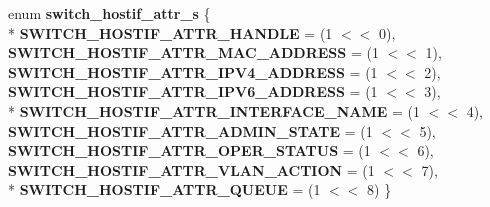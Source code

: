 \begin{DoxyCompactItemize}
\item 
\hypertarget{group__HostInterface_ga2afb2a6d4f95e81cc08ee0d6b3198780}{enum {\bfseries switch\+\_\+hostif\+\_\+attr\+\_\+s} \{ \\*
{\bfseries S\+W\+I\+T\+C\+H\+\_\+\+H\+O\+S\+T\+I\+F\+\_\+\+A\+T\+T\+R\+\_\+\+H\+A\+N\+D\+L\+E} = (1 $<$$<$ 0), 
{\bfseries S\+W\+I\+T\+C\+H\+\_\+\+H\+O\+S\+T\+I\+F\+\_\+\+A\+T\+T\+R\+\_\+\+M\+A\+C\+\_\+\+A\+D\+D\+R\+E\+S\+S} = (1 $<$$<$ 1), 
{\bfseries S\+W\+I\+T\+C\+H\+\_\+\+H\+O\+S\+T\+I\+F\+\_\+\+A\+T\+T\+R\+\_\+\+I\+P\+V4\+\_\+\+A\+D\+D\+R\+E\+S\+S} = (1 $<$$<$ 2), 
{\bfseries S\+W\+I\+T\+C\+H\+\_\+\+H\+O\+S\+T\+I\+F\+\_\+\+A\+T\+T\+R\+\_\+\+I\+P\+V6\+\_\+\+A\+D\+D\+R\+E\+S\+S} = (1 $<$$<$ 3), 
\\*
{\bfseries S\+W\+I\+T\+C\+H\+\_\+\+H\+O\+S\+T\+I\+F\+\_\+\+A\+T\+T\+R\+\_\+\+I\+N\+T\+E\+R\+F\+A\+C\+E\+\_\+\+N\+A\+M\+E} = (1 $<$$<$ 4), 
{\bfseries S\+W\+I\+T\+C\+H\+\_\+\+H\+O\+S\+T\+I\+F\+\_\+\+A\+T\+T\+R\+\_\+\+A\+D\+M\+I\+N\+\_\+\+S\+T\+A\+T\+E} = (1 $<$$<$ 5), 
{\bfseries S\+W\+I\+T\+C\+H\+\_\+\+H\+O\+S\+T\+I\+F\+\_\+\+A\+T\+T\+R\+\_\+\+O\+P\+E\+R\+\_\+\+S\+T\+A\+T\+U\+S} = (1 $<$$<$ 6), 
{\bfseries S\+W\+I\+T\+C\+H\+\_\+\+H\+O\+S\+T\+I\+F\+\_\+\+A\+T\+T\+R\+\_\+\+V\+L\+A\+N\+\_\+\+A\+C\+T\+I\+O\+N} = (1 $<$$<$ 7), 
\\*
{\bfseries S\+W\+I\+T\+C\+H\+\_\+\+H\+O\+S\+T\+I\+F\+\_\+\+A\+T\+T\+R\+\_\+\+Q\+U\+E\+U\+E} = (1 $<$$<$ 8)
 \}}\label{group__HostInterface_ga2afb2a6d4f95e81cc08ee0d6b3198780}


\end{DoxyCompactItemize}
